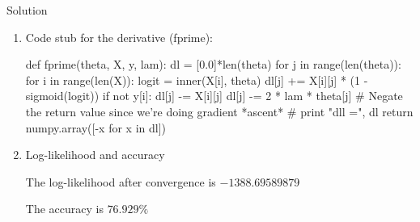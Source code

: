 \documentclass{assignment}
\begin{document}
\begin{problemlist}
\pbitem Solution

\begin{enumerate}
\item Code stub for the derivative (fprime):

\begin{python}
def fprime(theta, X, y, lam):
    dl = [0.0]*len(theta)
    for j in range(len(theta)):
        for i in range(len(X)):
            logit = inner(X[i], theta)
            dl[j] += X[i][j] * (1 - sigmoid(logit))
            if not y[i]:
                dl[j] -= X[i][j]
        dl[j] -= 2 * lam * theta[j]
    # Negate the return value since we're doing gradient *ascent*
    # print "dll =", dl
    return numpy.array([-x for x in dl])
\end{python}

\item Log-likelihood and accuracy

The log-likelihood after convergence is $-1388.69589879$ 

The accuracy is $76.929\%$
 
\end{enumerate}


\end{problemlist}
\end{document}
